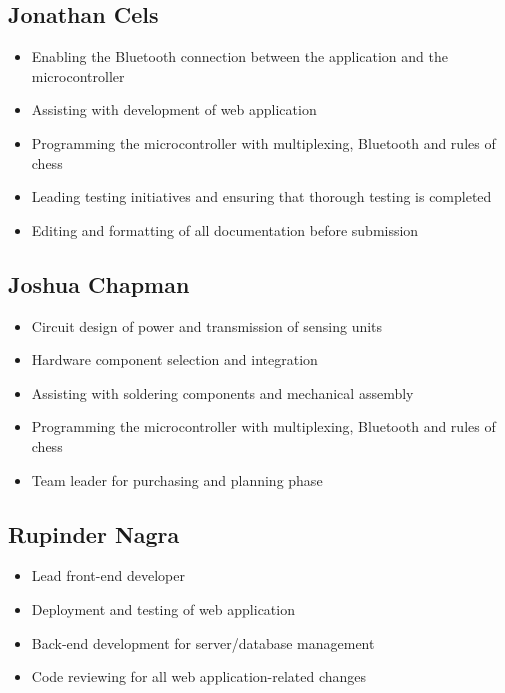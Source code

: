 \documentclass{article}
\begin{document}
\subsection{Jonathan Cels}
\begin{itemize}
    \item Enabling the Bluetooth connection between the application and the microcontroller
    \item Assisting with development of web application
    \item Programming the microcontroller with multiplexing, Bluetooth and rules of chess
    \item Leading testing initiatives and ensuring that thorough testing is completed
    \item Editing and formatting of all documentation before submission
\end{itemize}

\subsection{Joshua Chapman}
\begin{itemize}
    \item Circuit design of power and transmission of sensing units
    \item Hardware component selection and integration
    \item Assisting with soldering components and mechanical assembly
    \item Programming the microcontroller with multiplexing, Bluetooth and rules of chess
    \item Team leader for purchasing and planning phase
\end{itemize}

\subsection{Rupinder Nagra}
\begin{itemize}
    \item Lead front-end developer
    \item Deployment and testing of web application
    \item Back-end development for server/database management
    \item Code reviewing for all web application-related changes
\end{itemize}
\end{document}
